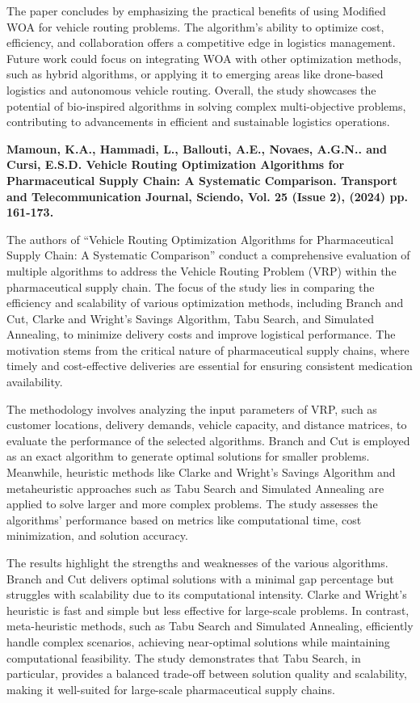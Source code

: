 The paper concludes by emphasizing the practical benefits of using Modified WOA for vehicle routing problems. The algorithm’s ability to optimize cost, efficiency, and collaboration offers a competitive edge in logistics management. Future work could focus on integrating WOA with other optimization methods, such as hybrid algorithms, or applying it to emerging areas like drone-based logistics and autonomous vehicle routing. Overall, the study showcases the potential of bio-inspired algorithms in solving complex multi-objective problems, contributing to advancements in efficient and sustainable logistics operations.

\textbf{\cite{mamoun2024pharmaceutical}Mamoun, K.A., Hammadi, L., Ballouti, A.E., Novaes, A.G.N.. and Cursi, E.S.D. Vehicle Routing Optimization Algorithms for Pharmaceutical Supply Chain: A Systematic Comparison. Transport and Telecommunication Journal, Sciendo, Vol. 25 (Issue 2), (2024) pp. 161-173.}

The authors of “Vehicle Routing Optimization Algorithms for Pharmaceutical Supply Chain: A Systematic Comparison” conduct a comprehensive evaluation of multiple algorithms to address the Vehicle Routing Problem (VRP) within the pharmaceutical supply chain. The focus of the study lies in comparing the efficiency and scalability of various optimization methods, including Branch and Cut, Clarke and Wright's Savings Algorithm, Tabu Search, and Simulated Annealing, to minimize delivery costs and improve logistical performance. The motivation stems from the critical nature of pharmaceutical supply chains, where timely and cost-effective deliveries are essential for ensuring consistent medication availability.

The methodology involves analyzing the input parameters of VRP, such as customer locations, delivery demands, vehicle capacity, and distance matrices, to evaluate the performance of the selected algorithms. Branch and Cut is employed as an exact algorithm to generate optimal solutions for smaller problems. Meanwhile, heuristic methods like Clarke and Wright's Savings Algorithm and metaheuristic approaches such as Tabu Search and Simulated Annealing are applied to solve larger and more complex problems. The study assesses the algorithms' performance based on metrics like computational time, cost minimization, and solution accuracy.

The results highlight the strengths and weaknesses of the various algorithms. Branch and Cut delivers optimal solutions with a minimal gap percentage but struggles with scalability due to its computational intensity. Clarke and Wright's heuristic is fast and simple but less effective for large-scale problems. In contrast, meta-heuristic methods, such as Tabu Search and Simulated Annealing, efficiently handle complex scenarios, achieving near-optimal solutions while maintaining computational feasibility. The study demonstrates that Tabu Search, in particular, provides a balanced trade-off between solution quality and scalability, making it well-suited for large-scale pharmaceutical supply chains.


